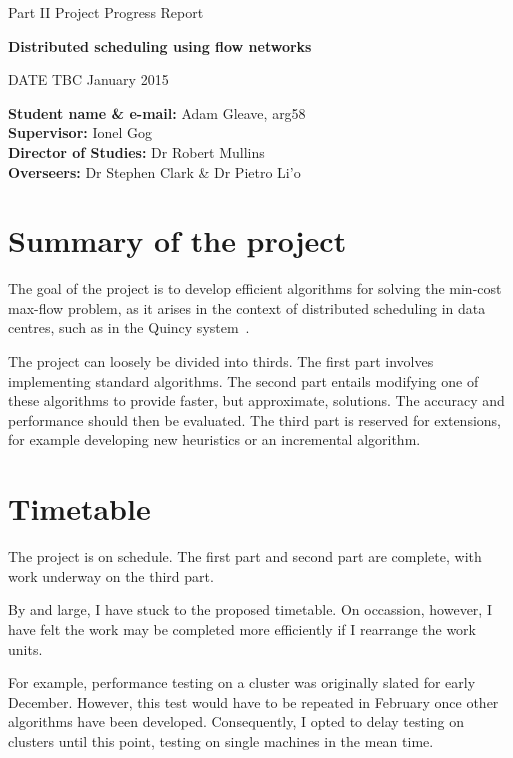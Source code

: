 
\centerline{\Large Part II Project Progress Report}
\vspace{0.1in}
\centerline{\large \textbf{Distributed scheduling using flow networks}}
\vspace{0.1in}
\centerline{DATE TBC January 2015}


\textbf{Student name \& e-mail:} Adam Gleave, arg58 \hfil \\
\textbf{Supervisor:} Ionel Gog \hfil \\
\textbf{Director of Studies:} Dr Robert Mullins \hfil \\
\textbf{Overseers:} Dr Stephen Clark \& Dr Pietro Li\a'o \hfil \\


\section{Summary of the project}
The goal of the project is to develop efficient algorithms for solving the min-cost max-flow problem, as it arises in the context of distributed scheduling in data centres, such as in the Quincy system~\cite{Isard:2009}. 

The project can loosely be divided into thirds. The first part involves implementing standard algorithms. The second part entails modifying one of these algorithms to provide faster, but approximate, solutions. The accuracy and performance should then be evaluated. The third part is reserved for extensions, for example developing new heuristics or an incremental algorithm.

\section{Timetable}
The project is on schedule. The first part and second part are complete, with work underway on the third part. 

By and large, I have stuck to the proposed timetable. On occassion, however, I have felt the work may be completed more efficiently if I rearrange the work units. 

For example, performance testing on a cluster was originally slated for early December. However, this test would have to be repeated in February once other algorithms have been developed. Consequently, I opted to delay testing on clusters until this point, testing on single machines in the mean time.


